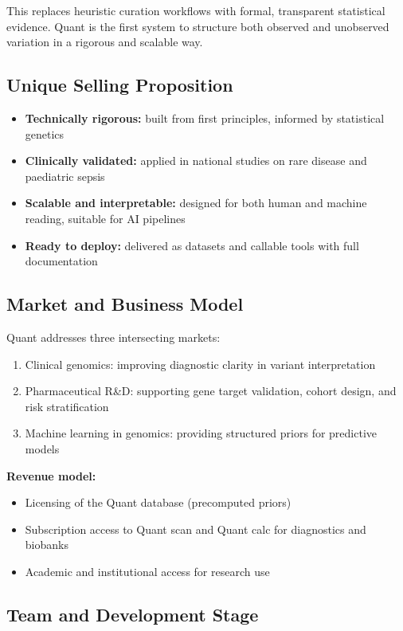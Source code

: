\documentclass[preprint,12pt,fleqn]{article}
\begin{document}
This replaces heuristic curation workflows with formal, transparent statistical evidence. Quant is the first system to structure both observed and unobserved variation in a rigorous and scalable way.

\subsection{Unique Selling Proposition}

\begin{itemize}
  \item \textbf{Technically rigorous:} built from first principles, informed by statistical genetics
  \item \textbf{Clinically validated:} applied in national studies on rare disease and paediatric sepsis
  \item \textbf{Scalable and interpretable:} designed for both human and machine reading, suitable for AI pipelines
  \item \textbf{Ready to deploy:} delivered as datasets and callable tools with full documentation
\end{itemize}

\subsection{Market and Business Model}

Quant addresses three intersecting markets:
\begin{enumerate}
  \item Clinical genomics: improving diagnostic clarity in variant interpretation
  \item Pharmaceutical R\&D: supporting gene target validation, cohort design, and risk stratification
  \item Machine learning in genomics: providing structured priors for predictive models
\end{enumerate}

\textbf{Revenue model:}
\begin{itemize}
  \item Licensing of the Quant database (precomputed priors)
  \item Subscription access to Quant scan and Quant calc for diagnostics and biobanks
  \item Academic and institutional access for research use
\end{itemize}

\subsection{Team and Development Stage}
\end{document}
